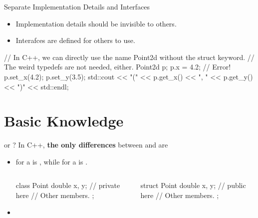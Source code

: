\documentclass{beamer}
\begin{document}
\begin{frame}[fragile]{Separate Implementation Details and Interfaces}
    \begin{itemize}
        \item Implementation details should be invisible to others.
        \item Interafces are defined for others to use.
    \end{itemize}
    \begin{center}
        \begin{cpp}
// In C++, we can directly use the name Point2d without the struct keyword.
// The weird typedefs are not needed, either.
Point2d p;
p.x = 4.2;  // Error!
p.set_x(4.2);
p.set_y(3.5);
std::cout << "(" << p.get_x() << ", "
          << p.get_y() << ")" << std::endl;
        \end{cpp}    
    \end{center}
\end{frame}

\section{Basic Knowledge}

\begin{frame}[fragile]{\class or \struct?}
    In C++, \textbf{the only differences} between \class and \struct are
    \begin{itemize}
        \item {} for a \class is , while for a \struct is .
        \begin{columns}
            \begin{column}{0.5\linewidth}
                \begin{cpp}
class Point {
  double x, y; // private here
  // Other members.
};
                \end{cpp}
            \end{column}
            \begin{column}{0.5\linewidth}
                \begin{cpp}
struct Point {
  double x, y; // public here
  // Other members.
};
                \end{cpp}
            \end{column}
        \end{columns}
        \item {}
    \end{itemize}
\end{frame}
\end{document}
